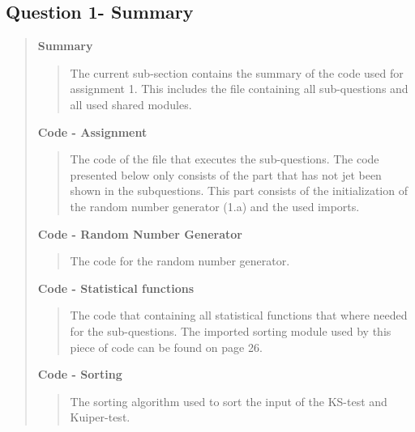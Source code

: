 
\subsection*{\textbf{Question 1- Summary}}
\begin{quote}

\textbf{Summary}
\begin{quote}
The current sub-section contains the summary of the code used for assignment 1. This includes the file  containing all sub-questions and all used shared modules. 
\end{quote}


\textbf{Code - Assignment}

\begin{quote}
The code of the file that executes the sub-questions. The code presented below only consists of the part that has not jet been shown in the subquestions.  This part consists of the initialization of the random number generator (1.a) and the used imports. 
\label{CODE:MAIN1}

\end{quote}

\textbf{Code - Random Number Generator} \\
\begin{quote}
The code for the random number generator.
\label{CODE:RNG}

\end{quote}

\textbf{Code - Statistical functions} \\

\begin{quote}
The code that containing all statistical functions that where needed for the sub-questions. The imported sorting module used by this piece of code can be found on page 26. 
\label{CODE:Statistics}


\end{quote}

\textbf{Code - Sorting} \\

\begin{quote}
The sorting algorithm used to sort the input of the KS-test and Kuiper-test.

\label{CODE:Sorting}
\end{quote}
\end{quote}

\newpage

%

